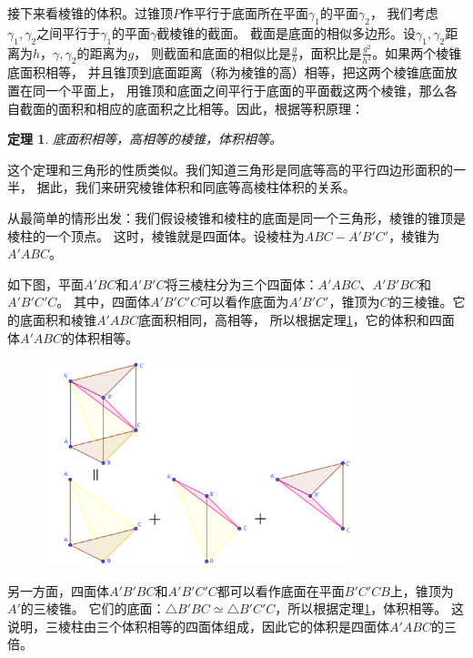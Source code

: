 \documentclass[12pt,UTF8]{ctexbook}
\newtheorem{tm}{定理}[section]
\begin{document}
接下来看棱锥的体积。过锥顶$P$作平行于底面所在平面$\gamma_1$的平面$\gamma_2$，
我们考虑$\gamma_1,\gamma_2$之间平行于$\gamma_1$的平面$\gamma$截棱锥的截面。
截面是底面的相似多边形。设$\gamma_1,\gamma_2$距离为$h$，$\gamma,\gamma_2$的距离为$g$，
则截面和底面的相似比是$\frac{g}{h}$，面积比是$\frac{g^2}{h^2}$。如果两个棱锥底面积相等，
并且锥顶到底面距离（称为棱锥的高）相等，把这两个棱锥底面放置在同一个平面上，
用锥顶和底面之间平行于底面的平面截这两个棱锥，那么各自截面的面积和相应的底面积之比相等。因此，根据等积原理：
\begin{tm}\label{tm:3-2-10}
    底面积相等，高相等的棱锥，体积相等。
\end{tm}
这个定理和三角形的性质类似。我们知道三角形是同底等高的平行四边形面积的一半，
据此，我们来研究棱锥体积和同底等高棱柱体积的关系。

从最简单的情形出发：我们假设棱锥和棱柱的底面是同一个三角形，棱锥的锥顶是棱柱的一个顶点。
这时，棱锥就是四面体。设棱柱为$ABC-A'B'C'$，棱锥为$A'ABC$。

如下图，平面$A'BC$和$A'B'C$将三棱柱分为三个四面体：$A'ABC$、$A'B'BC$和$A'B'C'C$。
其中，四面体$A'B'C'C$可以看作底面为$A'B'C'$，锥顶为$C$的三棱锥。它的底面积和棱锥$A'ABC$底面积相同，高相等，
所以根据定理\ref{tm:3-2-10}，它的体积和四面体$A'ABC$的体积相等。

\begin{figure}[h]
    \vspace{4pt}
    \centering
    \includegraphics[width=0.8\textwidth]{三棱柱体积1.png}
    \captionsetup{justification=centering}
\end{figure}

另一方面，四面体$A'B'BC$和$A'B'C'C$都可以看作底面在平面$B'C'CB$上，锥顶为$A'$的三棱锥。
它们的底面：$\triangle B'BC \simeq \triangle B'C'C$，所以根据定理\ref{tm:3-2-10}，体积相等。
这说明，三棱柱由三个体积相等的四面体组成，因此它的体积是四面体$A'ABC$的三倍。
\end{document}
